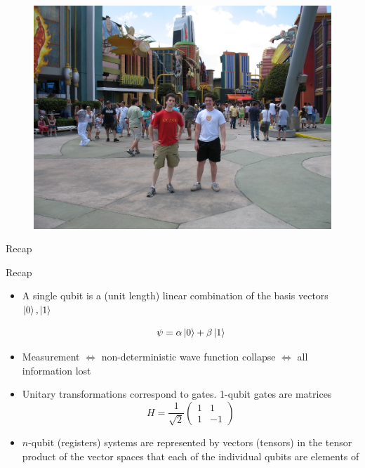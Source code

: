 \documentclass{beamer}
\begin{document}
\begin{frame}
  \begin{figure}[ht]
    \includegraphics[scale=1.3]{pasted19}
  \end{figure}
\end{frame}


\begin{frame}{\textbf{}}
\begin{center} \Huge Recap\end{center}
\end{frame}

\begin{frame}{Recap}
  
\begin{itemize}
     \item A single qubit is a (unit length) linear combination of the basis vectors $\Ket{0},\Ket{1}$
  
       \[
       \psi=\alpha\Ket{0}+\beta\Ket{1}
       \] 
         
     \item Measurement $\iff$ non-deterministic wave function collapse $\iff$ all 
information lost
     \item Unitary transformations correspond to gates. 1-qubit gates are matrices 
       \[
       H=\frac{1}{\sqrt{2}}\begin{pmatrix}1 & 1\\
         1 & -1
       \end{pmatrix}
       \]

       \item $n$-qubit (registers) systems are represented by vectors (tensors) in the 
         tensor product of the vector spaces that each of the individual qubits are 
         elements of
\end{itemize}
\end{frame}
\end{document}
